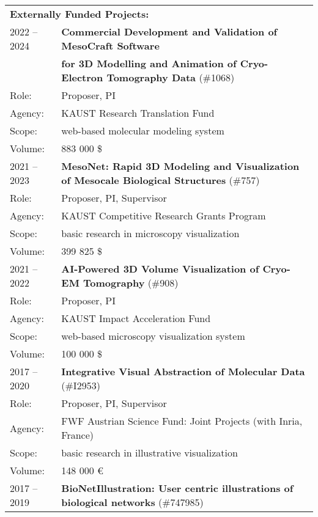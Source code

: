 \documentclass[a4paper,11pt]{letter}
\begin{document}
\small
\begin{tabular}{l| l}
\multicolumn{2}{l}{\large{\textbf{Externally Funded Projects:}}} \\
2022 -- 2024 & \textbf{Commercial Development and Validation of MesoCraft Software} \\
 & \textbf{for 3D Modelling and Animation of Cryo-Electron Tomography Data} (\#1068) \\
Role: & Proposer, PI \\
Agency: & KAUST Research Translation Fund \\
Scope: & web-based molecular modeling system\\
Volume: & 883 000 \$ \\
\hline
2021 -- 2023 & \textbf{MesoNet: Rapid 3D Modeling and Visualization of Mesocale Biological Structures} (\#757) \\
Role: & Proposer, PI, Supervisor \\
Agency: & KAUST Competitive Research Grants Program \\
Scope: & basic research in microscopy visualization \\
Volume: & 399 825 \$ \\
\hline
2021 -- 2022 & \textbf{AI-Powered 3D Volume Visualization of Cryo-EM Tomography} (\#908) \\
Role: & Proposer, PI \\
Agency: & KAUST Impact Acceleration Fund \\
Scope: & web-based microscopy visualization system\\
Volume: & 100 000 \$ \\
\hline
2017 -- 2020 & \textbf{Integrative Visual Abstraction of Molecular Data} (\#I2953) \\
Role: & Proposer, PI, Supervisor \\
Agency: & FWF Austrian Science Fund: Joint Projects (with Inria, France) \\
Scope: & basic research in illustrative visualization \\
Volume: & 148 000 \euro{} \\
\hline
2017 -- 2019 & \textbf{BioNetIllustration: User centric illustrations of biological networks} (\#747985) \\

\end{tabular}
\end{document}
